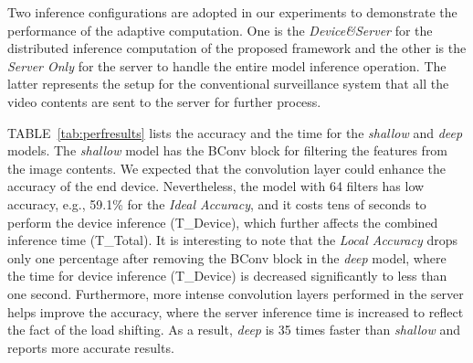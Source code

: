 \documentclass[conference]{IEEEtran}
\def\tablename{TABLE}
\begin{document}
%

Two inference configurations are adopted in our experiments to demonstrate the performance of the adaptive computation. One is the \emph{Device\&Server} for the distributed inference computation of the proposed framework and the other is the \emph{Server Only} for the server to handle the entire model inference operation. The latter represents the setup for the conventional surveillance system that all the video contents are sent to the server for further process.

\tablename~\ref{tab:perfresults} lists the accuracy and the time for the \emph{shallow} and \emph{deep} models. The \emph{shallow} model has the BConv block for filtering the features from the image contents. We expected that the convolution layer could enhance the accuracy of the end device. Nevertheless, the model with 64 filters has low accuracy, e.g., 59.1\% for the \emph{Ideal Accuracy}, and it costs tens of seconds to perform the device inference (T\_Device), which further affects the combined inference time (T\_Total). It is interesting to note that the \emph{Local Accuracy} drops only one percentage after removing the BConv block in the \emph{deep} model, where the time for device inference (T\_Device) is decreased significantly to less than one second. Furthermore, more intense convolution layers performed in the server helps improve the accuracy, where the server inference time is increased to reflect the fact of the load shifting. As a result, \emph{deep} is 35 times faster than \emph{shallow} and reports more accurate results.
\end{document}
